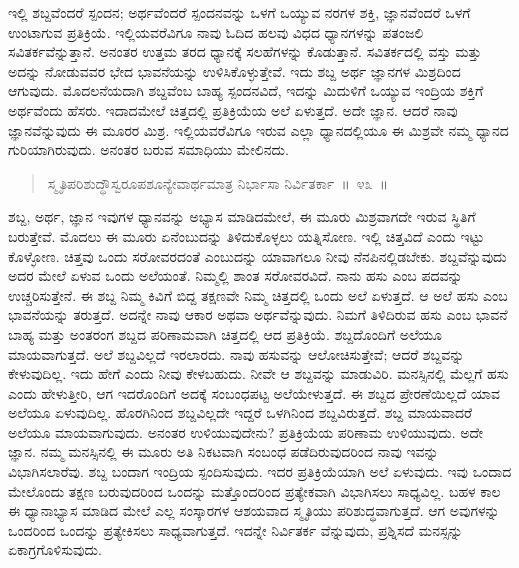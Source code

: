 \vspace{-0.3cm}


ಇಲ್ಲಿ ಶಬ್ದವೆಂದರೆ ಸ್ಪಂದನ; ಅರ್ಥವೆಂದರೆ ಸ್ಪಂದನವನ್ನು ಒಳಗೆ ಒಯ್ಯುವ ನರಗಳ ಶಕ್ತಿ, ಜ್ಞಾನವೆಂದರೆ ಒಳಗೆ ಉಂಟಾಗುವ ಪ್ರತಿಕ್ರಿಯೆ. ಇಲ್ಲಿಯವರೆವಿಗೂ ನಾವು ಓದಿದ ಹಲವು ವಿಧದ ಧ್ಯಾನಗಳನ್ನು ಪತಂಜಲಿ ಸವಿತರ್ಕವೆನ್ನುತ್ತಾನೆ. ಅನಂತರ ಉತ್ತಮ ತರದ ಧ್ಯಾನಕ್ಕೆ ಸಲಹೆಗಳನ್ನು ಕೊಡುತ್ತಾನೆ. ಸವಿತರ್ಕದಲ್ಲಿ ವಸ್ತು ಮತ್ತು ಅದನ್ನು ನೋಡುವವರ ಭೇದ ಭಾವನೆಯನ್ನು ಉಳಿಸಿಕೊಳ್ಳುತ್ತೇವೆ. ಇದು ಶಬ್ದ ಅರ್ಥ ಜ್ಞಾನಗಳ ಮಿಶ್ರದಿಂದ ಆಗುವುದು. ಮೊದಲನೆಯದಾಗಿ ಶಬ್ದವೆಂಬ ಬಾಹ್ಯ ಸ್ಪಂದನವಿದೆ, ಇದನ್ನು ಮಿದುಳಿಗೆ ಒಯ್ಯುವ ಇಂದ್ರಿಯ ಶಕ್ತಿಗೆ ಅರ್ಥವೆಂದು ಹೆಸರು. ಇದಾದಮೇಲೆ ಚಿತ್ತದಲ್ಲಿ ಪ್ರತಿಕ್ರಿಯೆಯ ಅಲೆ ಏಳುತ್ತದೆ. ಅದೇ ಜ್ಞಾನ. ಆದರೆ ನಾವು ಜ್ಞಾನವೆನ್ನುವುದು ಈ ಮೂರರ ಮಿಶ್ರ. ಇಲ್ಲಿಯವರೆವಿಗೂ ಇರುವ ಎಲ್ಲಾ ಧ್ಯಾನದಲ್ಲಿಯೂ ಈ ಮಿಶ್ರವೇ ನಮ್ಮ ಧ್ಯಾನದ ಗುರಿಯಾಗಿರುವುದು. ಅನಂತರ ಬರುವ ಸಮಾಧಿಯು ಮೇಲಿನದು. 

\vspace{-0.3cm}

\begin{verse}
ಸ್ಮೃತಿಪರಿಶುದ್ಧೌಸ್ವರೂಪಶೂನ್ಯೇವಾರ್ಥಮಾತ್ರ ನಿರ್ಭಾಸಾ ನಿರ್ವಿತರ್ಕಾ~॥~೪೩~॥
\end{verse}

\vspace{-0.3cm}


ಶಬ್ದ, ಅರ್ಥ, ಜ್ಞಾನ ಇವುಗಳ ಧ್ಯಾನವನ್ನು ಅಭ್ಯಾಸ ಮಾಡಿದಮೇಲೆ, ಈ ಮೂರು ಮಿಶ್ರವಾಗದೇ ಇರುವ ಸ್ಥಿತಿಗೆ ಬರುತ್ತೇವೆ. ಮೊದಲು ಈ ಮೂರು ಏನೆಂಬುದನ್ನು ತಿಳಿದುಕೊಳ್ಳಲು ಯತ್ನಿಸೋಣ. ಇಲ್ಲಿ ಚಿತ್ತವಿದೆ ಎಂದು ಇಟ್ಟು ಕೊಳ್ಳೋಣ. ಚಿತ್ತವು ಒಂದು ಸರೋವರದಂತೆ ಎಂಬುದನ್ನು ಯಾವಾಗಲೂ ನೀವು ನೆನಪಿನಲ್ಲಿಡಬೇಕು. ಶಬ್ದವೆನ್ನುವುದು ಅದರ ಮೇಲೆ ಏಳುವ ಒಂದು ಅಲೆಯಂತೆ. ನಿಮ್ಮಲ್ಲಿ ಶಾಂತ ಸರೋವರವಿದೆ. ನಾನು ಹಸು ಎಂಬ ಪದವನ್ನು ಉಚ್ಚರಿಸುತ್ತೇನೆ. ಈ ಶಬ್ದ ನಿಮ್ಮ ಕಿವಿಗೆ ಬಿದ್ದ ತಕ್ಷಣವೇ ನಿಮ್ಮ ಚಿತ್ತದಲ್ಲಿ ಒಂದು ಅಲೆ ಏಳುತ್ತದೆ. ಆ ಅಲೆ ಹಸು ಎಂಬ ಭಾವನೆಯನ್ನು ತರುತ್ತದೆ. ಅದನ್ನೇ ನಾವು ಆಕಾರ ಅಥವಾ ಅರ್ಥವೆನ್ನುವುದು. ನಿಮಗೆ ತಿಳಿದಿರುವ ಹಸು ಎಂಬ ಭಾವನೆ ಬಾಹ್ಯ ಮತ್ತು ಅಂತರಂಗ ಶಬ್ದದ ಪರಿಣಾಮವಾಗಿ ಚಿತ್ತದಲ್ಲಿ ಆದ ಪ್ರತಿಕ್ರಿಯೆ. ಶಬ್ದದೊಂದಿಗೆ ಅಲೆಯೂ ಮಾಯವಾಗುತ್ತದೆ. ಅಲೆ ಶಬ್ದವಿಲ್ಲದೆ ಇರಲಾರದು. ನಾವು ಹಸುವನ್ನು ಆಲೋಚಿಸುತ್ತೇವೆ; ಆದರೆ ಶಬ್ದವನ್ನು ಕೇಳುವುದಿಲ್ಲ. ಇದು ಹೇಗೆ ಎಂದು ನೀವು ಕೇಳಬಹುದು. ನೀವೇ ಆ ಶಬ್ದವನ್ನು ಮಾಡುವಿರಿ. ಮನಸ್ಸಿನಲ್ಲಿ ಮೆಲ್ಲಗೆ ಹಸು ಎಂದು ಹೇಳುತ್ತೀರಿ, ಆಗ ಇದರೊಂದಿಗೆ ಅದಕ್ಕೆ ಸಂಬಂಧಪಟ್ಟ ಅಲೆಯೇಳುತ್ತದೆ. ಈ ಶಬ್ದದ ಪ್ರೇರಣೆಯಿಲ್ಲದೆ ಯಾವ ಅಲೆಯೂ ಏಳುವುದಿಲ್ಲ. ಹೊರಗಿನಿಂದ ಶಬ್ದವಿಲ್ಲದೇ ಇದ್ದರೆ ಒಳಗಿನಿಂದ ಶಬ್ದವಿರುತ್ತದೆ. ಶಬ್ದ ಮಾಯವಾದರೆ ಅಲೆಯೂ ಮಾಯವಾಗುವುದು. ಅನಂತರ ಉಳಿಯುವುದೇನು? ಪ್ರತಿಕ್ರಿಯೆಯ ಪರಿಣಾಮ ಉಳಿಯುವುದು. ಅದೇ ಜ್ಞಾನ. ನಮ್ಮ ಮನಸ್ಸಿನಲ್ಲಿ ಈ ಮೂರು ಅತಿ ನಿಕಟವಾಗಿ ಸಂಬಂಧ ಪಡೆದಿರುವುದರಿಂದ ನಾವು ಇವನ್ನು ವಿಭಾಗಿಸಲಾರೆವು. ಶಬ್ದ ಬಂದಾಗ ಇಂದ್ರಿಯ ಸ್ಪಂದಿಸುವುದು. ಇದರ ಪ್ರತಿಕ್ರಿಯೆಯಾಗಿ ಅಲೆ ಏಳುವುದು. ಇವು ಒಂದಾದ ಮೇಲೊಂದು ತಕ್ಷಣ ಬರುವುದರಿಂದ ಒಂದನ್ನು ಮತ್ತೊಂದರಿಂದ ಪ್ರತ್ಯೇಕವಾಗಿ ವಿಭಾಗಿಸಲು ಸಾಧ್ಯವಿಲ್ಲ. ಬಹಳ ಕಾಲ ಈ ಧ್ಯಾನಾಭ್ಯಾಸ ಮಾಡಿದ ಮೇಲೆ ಎಲ್ಲ ಸಂಸ್ಕಾರಗಳ ಆಶಯವಾದ ಸ್ಮೃತಿಯು ಪರಿಶುದ್ಧವಾಗುತ್ತದೆ. ಆಗ ಅವುಗಳನ್ನು ಒಂದರಿಂದ ಒಂದನ್ನು ಪ್ರತ್ಯೇಕಿಸಲು ಸಾಧ್ಯವಾಗುತ್ತದೆ. ಇದನ್ನೇ ನಿರ್ವಿತರ್ಕ ವೆನ್ನುವುದು, ಪ್ರಶ್ನಿಸದೆ ಮನಸ್ಸನ್ನು ಏಕಾಗ್ರಗೊಳಿಸುವುದು. 

